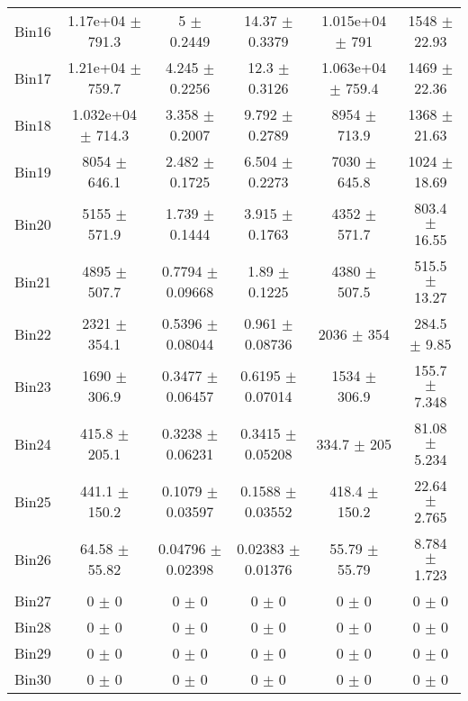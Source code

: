 \begin{tabular}{@{\extracolsep{4pt}}lccccc@{}}
     Bin16 & 1.17e+04 $\pm$ 791.3 & 5 $\pm$ 0.2449 & 14.37 $\pm$ 0.3379 & 1.015e+04 $\pm$ 791 & 1548 $\pm$ 22.93 \\ 
     Bin17 & 1.21e+04 $\pm$ 759.7 & 4.245 $\pm$ 0.2256 & 12.3 $\pm$ 0.3126 & 1.063e+04 $\pm$ 759.4 & 1469 $\pm$ 22.36 \\ 
     Bin18 & 1.032e+04 $\pm$ 714.3 & 3.358 $\pm$ 0.2007 & 9.792 $\pm$ 0.2789 & 8954 $\pm$ 713.9 & 1368 $\pm$ 21.63 \\ 
     Bin19 & 8054 $\pm$ 646.1 & 2.482 $\pm$ 0.1725 & 6.504 $\pm$ 0.2273 & 7030 $\pm$ 645.8 & 1024 $\pm$ 18.69 \\ 
     Bin20 & 5155 $\pm$ 571.9 & 1.739 $\pm$ 0.1444 & 3.915 $\pm$ 0.1763 & 4352 $\pm$ 571.7 & 803.4 $\pm$ 16.55 \\ 
     Bin21 & 4895 $\pm$ 507.7 & 0.7794 $\pm$ 0.09668 & 1.89 $\pm$ 0.1225 & 4380 $\pm$ 507.5 & 515.5 $\pm$ 13.27 \\ 
     Bin22 & 2321 $\pm$ 354.1 & 0.5396 $\pm$ 0.08044 & 0.961 $\pm$ 0.08736 & 2036 $\pm$ 354 & 284.5 $\pm$ 9.85 \\ 
     Bin23 & 1690 $\pm$ 306.9 & 0.3477 $\pm$ 0.06457 & 0.6195 $\pm$ 0.07014 & 1534 $\pm$ 306.9 & 155.7 $\pm$ 7.348 \\ 
     Bin24 & 415.8 $\pm$ 205.1 & 0.3238 $\pm$ 0.06231 & 0.3415 $\pm$ 0.05208 & 334.7 $\pm$ 205 & 81.08 $\pm$ 5.234 \\ 
     Bin25 & 441.1 $\pm$ 150.2 & 0.1079 $\pm$ 0.03597 & 0.1588 $\pm$ 0.03552 & 418.4 $\pm$ 150.2 & 22.64 $\pm$ 2.765 \\ 
     Bin26 & 64.58 $\pm$ 55.82 & 0.04796 $\pm$ 0.02398 & 0.02383 $\pm$ 0.01376 & 55.79 $\pm$ 55.79 & 8.784 $\pm$ 1.723 \\ 
     Bin27 & 0 $\pm$ 0 & 0 $\pm$ 0 & 0 $\pm$ 0 & 0 $\pm$ 0 & 0 $\pm$ 0 \\ 
     Bin28 & 0 $\pm$ 0 & 0 $\pm$ 0 & 0 $\pm$ 0 & 0 $\pm$ 0 & 0 $\pm$ 0 \\ 
     Bin29 & 0 $\pm$ 0 & 0 $\pm$ 0 & 0 $\pm$ 0 & 0 $\pm$ 0 & 0 $\pm$ 0 \\ 
     Bin30 & 0 $\pm$ 0 & 0 $\pm$ 0 & 0 $\pm$ 0 & 0 $\pm$ 0 & 0 $\pm$ 0 \\ 
\hline\hline
  \end{tabular}
